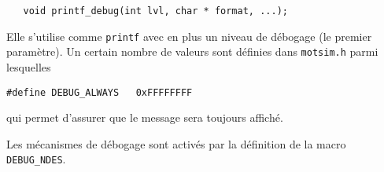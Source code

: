 \begin{verbatim}
   void printf_debug(int lvl, char * format, ...);
\end{verbatim}

   Elle s'utilise comme {\tt printf} avec en plus un niveau de
débogage (le premier paramètre). Un certain nombre de valeurs sont
définies dans {\tt motsim.h} parmi lesquelles

\begin{verbatim}
#define DEBUG_ALWAYS   0xFFFFFFFF
\end{verbatim}

   qui permet d'assurer que le message sera toujours affiché.

   Les mécanismes de débogage sont activés par la définition de la
macro {\tt DEBUG\_NDES}.

